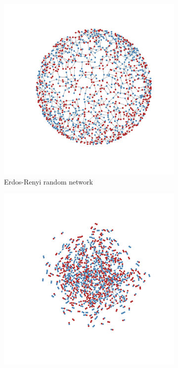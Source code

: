 \documentclass[man, 12pt, a4paper, nolmodern, noextraspace]{apa6}
\begin{document}
\begin{figure}
\captionsetup[subfigure]{labelfont=bf,textfont=normalfont,singlelinecheck=on}
    \centering
    \begin{subfigure}[t]{0.45\textwidth}
        \centering
        \includegraphics[trim={2cm 2cm 2cm 2cm}, clip, width=\linewidth]{draft/network_plots1.pdf} 
        \caption{Erdos-Renyi random network}
        \label{fig1:random}
    \end{subfigure}
    \hfill
    \begin{subfigure}[t]{0.45\textwidth}
        \centering
        \includegraphics[trim={2cm 2cm 2cm 2cm}, clip, width=\linewidth]{draft/network_plots2.pdf} 

\end{subfigure}
\end{figure}
\end{document}
